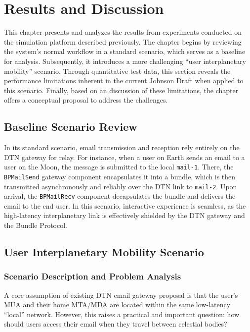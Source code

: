 \chapter{Results and Discussion}
This chapter presents and analyzes the results from experiments conducted on the simulation platform described previously.  
The chapter begins by reviewing the system's normal workflow in a standard scenario, which serves as a baseline for analysis.  
Subsequently, it introduces a more challenging ``user interplanetary mobility'' scenario.  
Through quantitative test data, this section reveals the performance limitations inherent in the current Johnson Draft when applied to this scenario.
Finally, based on an discussion of these limitations, the chapter offers a conceptual proposal to address the challenges.

\section{Baseline Scenario Review}

In its standard scenario, email transmission and reception rely entirely on the DTN gateway for relay.  
For instance, when a user on Earth sends an email to a user on the Moon, the message is submitted to the local \texttt{mail-1}.  
There, the \texttt{BPMailSend} gateway component encapsulates it into a bundle, which is then transmitted asynchronously and reliably over the DTN link to \texttt{mail-2}.  
Upon arrival, the \texttt{BPMailRecv} component decapsulates the bundle and delivers the email to the end user.  
In this scenario, interactive experience is seamless, as the high-latency interplanetary link is effectively shielded by the DTN gateway and the Bundle Protocol.

\section{User Interplanetary Mobility Scenario}

\subsection{Scenario Description and Problem Analysis}

A core assumption of existing DTN email gateway proposal is that the user's MUA and their home MTA/MDA are located within the same low-latency ``local'' network.  
However, this raises a practical and important question: how should users access their email when they travel between celestial bodies?

